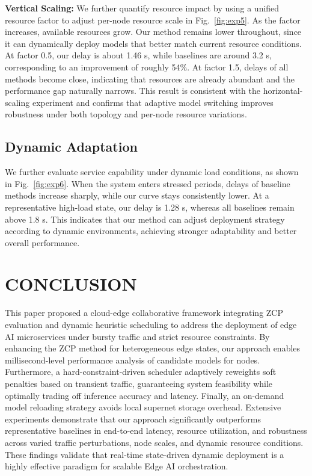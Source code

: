 \documentclass[conference]{IEEEtran}
\begin{document}
\textbf{Vertical Scaling:} We further quantify resource impact by using a unified resource factor to adjust per-node resource scale in Fig.~\ref{fig:exp5}. As the factor increases, available resources grow. Our method remains lower throughout, since it can dynamically deploy models that better match current resource conditions. At factor 0.5, our delay is about 1.46 s, while baselines are around 3.2 s, corresponding to an improvement of roughly 54\%. At factor 1.5, delays of all methods become close, indicating that resources are already abundant and the performance gap naturally narrows. This result is consistent with the horizontal-scaling experiment and confirms that adaptive model switching improves robustness under both topology and per-node resource variations.

\subsection{Dynamic Adaptation}

We further evaluate service capability under dynamic load conditions, as shown in Fig.~\ref{fig:exp6}. When the system enters stressed periods, delays of baseline methods increase sharply, while our curve stays consistently lower. At a representative high-load state, our delay is 1.28 s, whereas all baselines remain above 1.8 s. This indicates that our method can adjust deployment strategy according to dynamic environments, achieving stronger adaptability and better overall performance.

\section{CONCLUSION}

This paper proposed a cloud-edge collaborative framework integrating ZCP evaluation and dynamic heuristic scheduling to address the deployment of edge AI microservices under bursty traffic and strict resource constraints. By enhancing the ZCP method for heterogeneous edge states, our approach enables millisecond-level performance analysis of candidate models for nodes. Furthermore, a hard-constraint-driven scheduler adaptively reweights soft penalties based on transient traffic, guaranteeing system feasibility while optimally trading off inference accuracy and latency. Finally, an on-demand model reloading strategy avoids local supernet storage overhead. Extensive experiments demonstrate that our approach significantly outperforms representative baselines in end-to-end latency, resource utilization, and robustness across varied traffic perturbations, node scales, and dynamic resource conditions. These findings validate that real-time state-driven dynamic deployment is a highly effective paradigm for scalable Edge AI orchestration.
\end{document}
